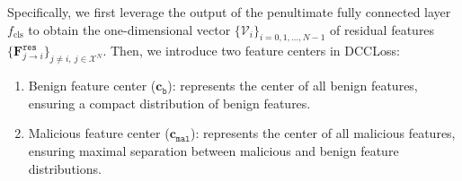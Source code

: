 
Specifically, we first leverage the output of the penultimate fully connected layer $f_{\text{cls}}$ to obtain the one-dimensional vector $\{\mathcal{V}_i\}_{i=0,1,\ldots, N-1}$ of residual features $\{\mathbf{F}^\mathtt{res}_{j\rightarrow i}\}_{j\neq i,\  j\in \mathcal{X}^N}$. Then, we introduce two feature centers in DCCLoss: 
\begin{enumerate}
    \vspace{-3mm}
    \setlength{\itemsep}{0pt}
    \setlength{\parskip}{0pt}
    \setlength{\parsep}{0pt}
    \item Benign feature center ($\mathbf{c}_{\mathtt{b}}$): represents the center of all benign features, ensuring a compact distribution of benign features.
    \item Malicious feature center ($\mathbf{c}_{\mathtt{mal}}$): represents the center of all malicious features, ensuring maximal separation between malicious and benign feature distributions.
    \vspace{-3mm}
    
\end{enumerate}

